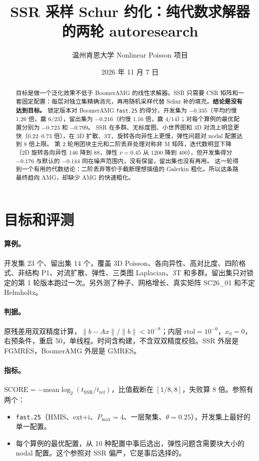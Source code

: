 \documentclass[11pt,a4paper]{ctexart}
\title{SSR 采样 Schur 约化：纯代数求解器的两轮 autoresearch}
\author{温州肯恩大学 \quad Nonlinear Poisson 项目}
\date{2026 年 11 月 7 日}
\begin{document}
\maketitle
\sloppy

\begin{abstract}
目标是做一个泛化效果不低于 BoomerAMG 的线性求解器。SSR 只需要 CSR 矩阵和一套固定配置：每层对独立集精确消元，再用随机采样代替 Schur 补的填充。\textbf{结论是没有达到目标。}
锁定版本对 BoomerAMG \texttt{fast.25} 的得分，开发集为 $-0.335$（平均约慢 1.26 倍，赢 6/23），留出集为 $-0.216$（约慢 1.16 倍，赢 4/14）；对每个算例的最优配置分别为 $-0.723$ 和 $-0.799$。
SSR 在多群、无标度图、小世界图和 3D 对流上明显更快（0.22--0.73 倍），在 3D 扩散、3T、旋转各向异性上更慢，弹性问题对 nodal 配置达到 8 倍上限。
第 2 轮用团块主元和二阶丢弃处理对称非 M 矩阵，迭代数明显下降（2D 旋转各向异性 146 降到 88，弹性 $\nu=0.45$ 从 1200 降到 400），但开发集得分 $-0.176$ 与默认的 $-0.144$ 同在噪声范围内，没有保留，留出集也没有再用。
这一轮得到一个有用的代数结论：二阶丢弃等价于截断理想插值的 Galerkin 粗化。所以这条路最终趋向 AMG，却缺少 AMG 的快速粗化。
\end{abstract}

\section{目标和评测}
\paragraph{算例。}开发集 23 个、留出集 14 个，覆盖 3D Poisson、各向异性、高对比度、四阶格式、非结构 P1、对流扩散、弹性、三类图 Laplacian、3T 和多群。留出集只对锁定的第 1 轮版本跑过一次。另外测了种子、网格增长、真实矩阵 SC26\_01 和不定 Helmholtz。

\paragraph{判据。}原残差用双双精度计算，$\|b-Ax\|/\|b\|<10^{-8}$；内层 $\text{rtol}=10^{-6}$，$x_0=0$，右预条件，重启 50，单线程。时间含构建，不含双双精度校验。SSR 外层是 FGMRES，BoomerAMG 外层是 GMRES。

\paragraph{指标。}$\text{SCORE}=-\text{mean}\log_2(t_\text{SSR}/t_\text{ref})$，比值截断在 $[1/8,8]$，失败算 8 倍。参照有两个：
\begin{itemize}
\item \texttt{fast.25}（HMIS、ext+i、$P_\text{max}=4$、一层聚集、$\theta=0.25$），开发集上最好的单一配置。
\item 每个算例的最优配置，从 10 种配置中事后选出，弹性问题含需要块大小的 nodal 配置。这个参照对 SSR 偏严，它是事后选择的。
\end{itemize}
\end{document}
